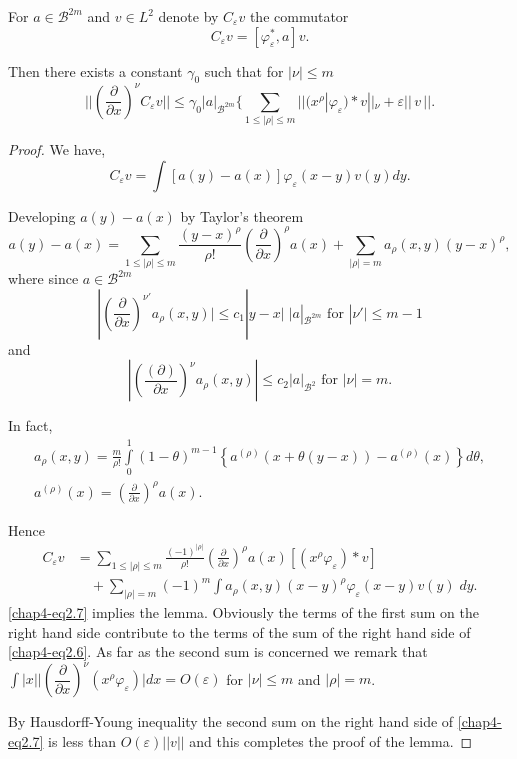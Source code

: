\setcounter{lemma}{0}
\begin{lemma}\label{chap4-sec2-lem1} %
For $a \in \mathscr{B}^{2m}$ and $v \in L^2$ denote by
$C_\varepsilon v$ the commutator  
\begin{equation}
C_\varepsilon v = [\varphi^*_\varepsilon, a]
v. \tag{2.5}\label{chap4-eq2.5} 
\end{equation}

Then there exists a constant $\gamma_0$ such that for $|\nu| \leq m$ 
\begin{equation}
|| \left(\frac{\partial }{\partial x}\right)^\nu C_\varepsilon v|| \leq \gamma_0
| a |_{\mathscr{B}^{2m}} \bigg\{\sum\limits_{1\leq|\rho|\leq m} || (x^\rho
| \varphi_\varepsilon)* v ||_\nu + \varepsilon ||\,v\,||. \tag{2.6} \label{chap4-eq2.6}  
\end{equation}
\end{lemma}

\begin{proof}
We have, 
$$
C_\varepsilon v = \int [a(y)- a(x)]\varphi_\varepsilon (x-y) v(y) dy.  
$$

Developing $a(y) - a(x)$ by Taylor's theorem 
$$
a(y) - a(x) = \sum_{1 \leq |\rho | \leq m} \frac{(y - x)^\rho}{\rho !}
\left(\frac{\partial}{\partial x}\right)^\rho a (x) + \sum\limits_{|\rho|=m}
a_\rho (x, y) (y - x)^\rho,  
$$
where since $a \in \mathscr{B}^{2m}$
$$
|\left(\frac{\partial}{\partial x}\right)^{\nu'} a_\rho (x, y ) \bigg| \leq c_1 |
y - x | \; | a |_{\mathscr{B}^{2m}} \text{ for } |\nu'| \leq m-1 
$$
and 
$$
| \left(\frac{(\partial)}{\partial x}\right)^\nu  a_\rho (x, y) | \leq c_2 | 
a|_{\mathscr{B}^{2}}\text{ for  } |\nu | = m .  
$$

In fact,\pageoriginale 
\begin{gather*}
a_\rho (x, y) = \frac{m}{\rho !} \int\limits^1_0 (1 -
\theta)^{m-1}\left\{ a^{(\rho)} (x + \theta (y - x)) - a^{(\rho)} (x)
\right\} d \theta,\\ 
a^{(\rho)} (x) = \left(\frac{\partial}{\partial
  x}\right)^\rho a(x).   
\end{gather*}

Hence 
\begin{align*}
C_\varepsilon v & = \sum\limits_{1 \leq |\rho| \leq m} \frac{(-
  1)^{|\rho|}}{\rho !} \left(\frac{\partial}{\partial x}\right)^\rho a(x)
\left[(x^\rho \varphi_\varepsilon) * v \right]  \\
& \quad + \sum_{|\rho|=m} (-1)^m \int a_\rho (x, y)
(x - y)^\rho \varphi_\varepsilon (x- y) v(y) \;
dy. \tag{2.7} \label{chap4-eq2.7} 
\end{align*}
\eqref{chap4-eq2.7} implies the lemma. Obviously the terms of the
first sum on the 
right hand side contribute to the terms of the sum of the right hand
side of \eqref{chap4-eq2.6}. As far as the second sum is concerned we
remark that 
$\int |x| \big|\left(\dfrac{\partial }{\partial x}\right)^\nu (x^\rho
\varphi_\varepsilon) \big| dx = O (\varepsilon)$ for $ |\nu |\leq m$ and
$|\rho| = m$.  

By Hausdorff-Young inequality the second sum on the right hand side of
\eqref{chap4-eq2.7} is less than $O(\varepsilon) || v || $ and this
completes the proof of the lemma.  
\end{proof}

